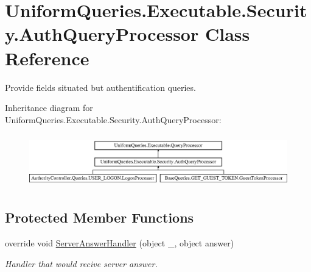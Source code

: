 \hypertarget{class_uniform_queries_1_1_executable_1_1_security_1_1_auth_query_processor}{}\section{Uniform\+Queries.\+Executable.\+Security.\+Auth\+Query\+Processor Class Reference}
\label{class_uniform_queries_1_1_executable_1_1_security_1_1_auth_query_processor}


Provide fields situated but authentification queries.  


Inheritance diagram for Uniform\+Queries.\+Executable.\+Security.\+Auth\+Query\+Processor\+:\begin{figure}[H]
\begin{center}
\leavevmode
\includegraphics[height=2.326870cm]{dc/d63/class_uniform_queries_1_1_executable_1_1_security_1_1_auth_query_processor}
\end{center}
\end{figure}
\subsection*{Protected Member Functions}
\begin{DoxyCompactItemize}
\item 
override void \mbox{\hyperlink{class_uniform_queries_1_1_executable_1_1_security_1_1_auth_query_processor_a4693289bf81ca5d98fe8f5678a7c4b87}{Server\+Answer\+Handler}} (object \+\_\+, object answer)
\begin{DoxyCompactList}\small\item\em Handler that would recive server answer. \end{DoxyCompactList}\end{DoxyCompactItemize}

